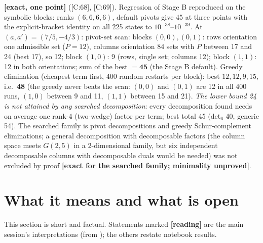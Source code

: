 \documentclass[10pt]{article}
\newcommand{\nb}[1]{\texttt{\path{#1}}}
\newcommand{\cl}[2]{\textsf{[#1:#2]}}
\newcommand{\tg}[1]{\textbf{[#1]}}
\begin{document}
\tg{exact, one point} (\cl{C}{68}, \cl{C}{69}). Regression of Stage B reproduced on the symbolic blocks: ranks $(6,6,6,6)$, default pivots give 45 at three points with the explicit-bracket identity on all 225 states to $10^{-38}$--$10^{-39}$. At $(a,a')=(7/5,-4/3)$: pivot-set scan: blocks $(0,0),(0,1)$: rows orientation one admissible set ($P=12$), columns orientation 84 sets with $P$ between 17 and 24 (best 17), so 12; block $(1,\allowbreak 0)$: 9 (rows, single set; columns 12); block $(1,\allowbreak 1)$: 12 in both orientations; sum of the best $=\mathbf{45}$ (the Stage B default). Greedy elimination (cheapest term first, 400 random restarts per block): best $12,12,9,15$, i.e.\ \textbf{48} (the greedy never beats the scan: $(0,\allowbreak 0)$ and $(0,\allowbreak 1)$ are 12 in all 400 runs, $(1,\allowbreak 0)$ between 9 and 11, $(1,\allowbreak 1)$ between 15 and 21). \emph{The lower bound 24 is not attained by any searched decomposition}: every decomposition found needs on average one rank-4 (two-wedge) factor per term; best total 45 (det$_6$ 40, generic 54). The searched family is pivot decompositions and greedy Schur-complement eliminations; a general decomposition with decomposable factors (the column space meets $G(2,5)$ in a 2-dimensional family, but six independent decomposable columns with decomposable duals would be needed) was not excluded by proof \tg{exact for the searched family; minimality unproved}.

\section{What it means and what is open}\label{sec:open}

This section is short and factual. Statements marked \tg{reading} are the main session's interpretations (from \nb{HANDOFF.md}); the others restate notebook results.
\end{document}
